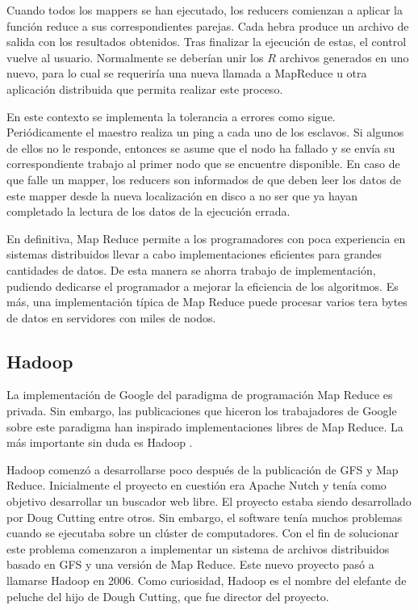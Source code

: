 \documentclass[10pt]{article}
\begin{document}
		Cuando todos los mappers se han ejecutado, los reducers comienzan a aplicar la función reduce a sus correspondientes parejas. Cada hebra produce un archivo de salida con los resultados obtenidos. Tras finalizar la ejecución de estas, el control vuelve al usuario. Normalmente se deberían unir los $R$ archivos generados en uno nuevo, para lo cual se requeriría una nueva llamada a MapReduce u otra aplicación distribuida que permita realizar este proceso.

		En este contexto se implementa la tolerancia a errores como sigue. Periódicamente el maestro realiza un ping a cada uno de los esclavos. Si algunos de ellos no le responde, entonces se asume que el nodo ha fallado y se envía su correspondiente trabajo al primer nodo que se encuentre disponible. En caso de que falle un mapper, los reducers son informados de que deben leer los datos de este mapper desde la nueva localización en disco a no ser que ya hayan completado la lectura de los datos de la ejecución errada.

		En definitiva, Map Reduce permite a los programadores con poca experiencia en sistemas distribuidos llevar a cabo implementaciones eficientes para grandes cantidades de datos. De esta manera se ahorra trabajo de implementación, pudiendo dedicarse el programador a mejorar la eficiencia de los algoritmos. Es más, una implementación típica de Map Reduce puede procesar varios tera bytes de datos en servidores con miles de nodos.


	\subsection{Hadoop} \label{sec:mr-hadoop:hadoop}

		La implementación de Google del paradigma de programación Map Reduce es privada. Sin embargo, las publicaciones que hiceron los trabajadores de Google sobre este paradigma han inspirado implementaciones libres de Map Reduce. La más importante sin duda es Hadoop \cite{hadoop-book}. 
		
		Hadoop comenzó a desarrollarse poco después de la publicación de GFS y Map Reduce. Inicialmente el proyecto en cuestión era Apache Nutch \cite{nutch} y tenía como objetivo desarrollar un buscador web libre. El proyecto estaba siendo desarrollado por Doug Cutting entre otros. Sin embargo, el software tenía muchos problemas cuando se ejecutaba sobre un clúster de computadores. Con el fin de solucionar este problema comenzaron a implementar un sistema de archivos distribuidos basado en GFS y una versión de Map Reduce. Este nuevo proyecto pasó a llamarse Hadoop en 2006. Como curiosidad, Hadoop es el nombre del elefante de peluche del hijo de Dough Cutting, que fue director del proyecto.
		
\end{document}
